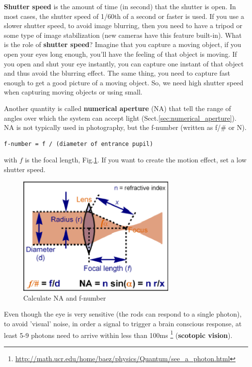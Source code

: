 {\bf Shutter speed} is the amount of time (in second) that the shutter is open.
In most cases, the shutter speed of 1/60th of a second or faster is used. 
If you use a slower shutter speed, to avoid image blurring, then you need to
have a tripod or some type of image stabilization (new cameras have this feature built-in). What
is the role of {\bf shutter speed}? Imagine that you capture a moving object, if
you open your eyes long enough, you'll have the feeling of that object is
moving. If you open and shut your eye instantly, you can capture one instant of
that object and thus avoid the blurring effect. The same thing, you need to
capture fast enough to get a good picture of a moving object.
So, we need high shutter speed when capturing moving objects or using small.

Another quantity is called {\bf numerical aperture} (NA) that tell the range of
angles over which the system can accept light
(Sect.\ref{sec:numerical_aperture}).
NA is not typically used in photography, but the f-number (written as f/\# or N).
\begin{verbatim}
f-number = f / (diameter of entrance pupil)
\end{verbatim}
with $f$ is the focal length, Fig.\ref{fig:NA_f-number}. If you want to create
the motion effect, set a low shutter speed.  


\begin{figure}[hbt]
  \centerline{\includegraphics[height=6cm,
    angle=0]{./images/NA_f-number.eps}}    
\caption{ Calculate NA and f-number}
\label{fig:NA_f-number}
\end{figure}

\begin{framed}
Even though the eye is very sensitive (the rods can respond to a single photon),
to avoid 'visual' noise, in order a signal to trigger a brain conscious
response, at least 5-9 photons need to arrive within less than 100ms
\footnote{\url{http://math.ucr.edu/home/baez/physics/Quantum/see_a_photon.html}}
({\bf scotopic vision}).
\end{framed}

